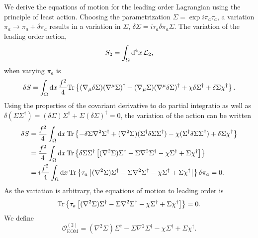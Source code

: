 We derive the equations of motion for the leading order Lagrangian using the principle of least action.
Choosing the parametrization $\Sigma = \exp{i \pi_a \tau_a}$, a variation $\pi_a \rightarrow \pi_a + \delta \pi_a$ results in a variation in $\Sigma$, $\delta \Sigma = i \tau_a \delta \pi_a \Sigma $.
The variation of the leading order action,
\begin{equation}
    S_2 = \int_\Omega \text{d}^4x \, \mathcal{L}_2,
\end{equation}
when varying $\pi_a$ is 
\begin{align*}
    \delta S = \int_\Omega \text{d} x \, \frac{f^2}{4}
    \text{Tr} \left\{ 
        (\nabla_\mu \delta \Sigma) (\nabla^\mu \Sigma)^\dagger
        + (\nabla_\mu \Sigma) (\nabla^\mu \delta \Sigma)^\dagger
        + \chi \delta \Sigma^\dagger + \delta \Sigma \chi^\dagger
     \right\}.
\end{align*}
Using the properties of the covariant derivative to do partial integratio as well as $\delta(\Sigma \Sigma^\dagger) = (\delta\Sigma)\Sigma^\dagger + \Sigma (\delta \Sigma)^\dagger = 0$, the variation of the action can be written
\begin{align*}
    \delta S 
    & = \frac{f^2}{4} \int_\Omega \text{d} x\, 
    \text{Tr} \left\{ 
        - \delta \Sigma \nabla^2 \Sigma^\dagger
        + (\nabla^2 \Sigma) (\Sigma^\dagger \delta \Sigma \Sigma^\dagger)
        - \chi (\Sigma^\dagger \delta \Sigma \Sigma^\dagger)
        + \delta \Sigma \chi^\dagger
     \right\} \\
    & = 
    \frac{f^2}{4} \int_\Omega \text{d} x\, 
    \text{Tr} \left\{ 
        \delta \Sigma \Sigma^\dagger 
        \left[
            (\nabla^2 \Sigma)\Sigma^\dagger
            - \Sigma \nabla^2 \Sigma^\dagger
            - \chi \Sigma^\dagger
            + \Sigma \chi^\dagger
        \right]
         \right\} \\
    & = 
    i \frac{f^2}{4} \int_\Omega \text{d} x\, 
    \text{Tr} \left\{ \tau_a 
    \left[
         (\nabla^2 \Sigma)\Sigma^\dagger
        - \Sigma \nabla^2 \Sigma^\dagger
        - \chi \Sigma^\dagger
        + \Sigma \chi^\dagger
    \right]
     \right\} 
    \delta \pi_a = 0.
\end{align*}
%
As the variation is arbitrary, the equations of motion to leading order is
%
\begin{equation}
    \text{Tr} \left\{ 
        \tau_a 
        \left[
            (\nabla^2 \Sigma)\Sigma^\dagger
            - \Sigma \nabla^2 \Sigma^\dagger
            - \chi \Sigma^\dagger
            + \Sigma \chi^\dagger
        \right]
     \right\} = 0.
\end{equation}
%
We define
%
\begin{equation}
    \mathcal O_\text{EOM}^{(2)}
    = 
    (\nabla^2 \Sigma)\Sigma^\dagger
    - \Sigma \nabla^2 \Sigma^\dagger
    - \chi \Sigma^\dagger
    + \Sigma \chi^\dagger.
\end{equation}


